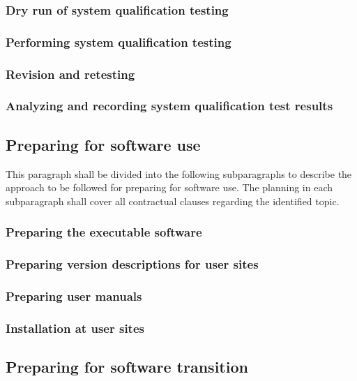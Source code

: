 \documentclass{fidata-report-template}
\begin{document}
\subsubsection{Dry run of system qualification testing}

\subsubsection{Performing system qualification testing}

\subsubsection{Revision and retesting}

\subsubsection{Analyzing and recording system qualification test
results}

\subsection{Preparing for software use}

This paragraph shall be divided into the following subparagraphs to
describe the approach to be followed for preparing for software use. The
planning in each subparagraph shall cover all contractual clauses
regarding the identified topic.

\subsubsection{Preparing the executable software}

\subsubsection{Preparing version descriptions for user sites}

\subsubsection{Preparing user manuals}

\subsubsection{Installation at user sites}

\subsection{Preparing for software transition}
\end{document}
